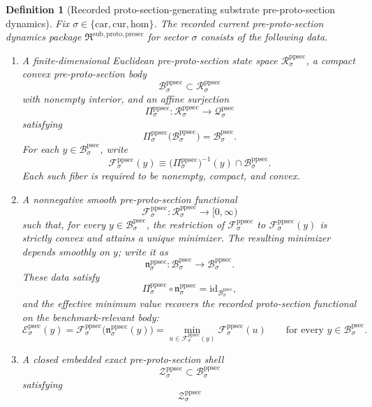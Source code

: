 \documentclass[11pt]{article}
\newcommand{\Car}{\mathrm{car}}
\newcommand{\Cur}{\mathrm{cur}}
\newcommand{\Hom}{\mathrm{hom}}
\newcommand{\ProtoSectionState}[1]{\mathcal Q_{#1}^{\mathrm{psec}}}
\newcommand{\ProtoSectionBody}[1]{\mathcal B_{#1}^{\mathrm{psec}}}
\newcommand{\ProtoSectionFunctional}[1]{\mathscr E_{#1}^{\mathrm{psec}}}
\newcommand{\PreProtoSectionPackage}{\mathfrak R^{\mathrm{sub,proto,presec}}}
\newcommand{\PreProtoSectionState}[1]{\mathcal R_{#1}^{\mathrm{ppsec}}}
\newcommand{\PreProtoSectionBody}[1]{\mathcal B_{#1}^{\mathrm{ppsec}}}
\newcommand{\PreProtoSectionProj}[1]{\Pi_{#1}^{\mathrm{ppsec}}}
\newcommand{\PreProtoSectionFiber}[2]{\mathcal F_{#1}^{\mathrm{ppsec}}(#2)}
\newcommand{\PreProtoSectionProtoMin}[1]{\mathfrak n_{#1}^{\mathrm{ppsec}}}
\newcommand{\PreProtoSectionFunctional}[1]{\mathscr F_{#1}^{\mathrm{ppsec}}}
\newcommand{\PreProtoSectionShell}[1]{\mathcal Z_{#1}^{\mathrm{ppsec}}}
\newtheorem{definition}{Definition}
\begin{document}
\begin{definition}[Recorded proto-section-generating substrate pre-proto-section dynamics]
\label{def:preprotosection}
Fix \(\sigma\in\{\Car,\Cur,\Hom\}\). The recorded current pre-proto-section dynamics package \(\PreProtoSectionPackage\) for sector \(\sigma\) consists of the following data.
\begin{enumerate}
    \item A finite-dimensional Euclidean pre-proto-section state space \(\PreProtoSectionState{\sigma}\), a compact convex pre-proto-section body
    \[
    \PreProtoSectionBody{\sigma}\subset\PreProtoSectionState{\sigma}
    \]
    with nonempty interior, and an affine surjection
    \[
    \PreProtoSectionProj{\sigma}:\PreProtoSectionState{\sigma}\to\ProtoSectionState{\sigma}
    \]
    satisfying
    \[
    \PreProtoSectionProj{\sigma}\bigl(\PreProtoSectionBody{\sigma}\bigr)=\ProtoSectionBody{\sigma}.
    \]
    For each \(y\in\ProtoSectionBody{\sigma}\), write
    \[
    \PreProtoSectionFiber{\sigma}{y}
    \equiv
    \bigl(\PreProtoSectionProj{\sigma}\bigr)^{-1}(y)\cap\PreProtoSectionBody{\sigma}.
    \]
    Each such fiber is required to be nonempty, compact, and convex.
    \item A nonnegative smooth pre-proto-section functional
    \[
    \PreProtoSectionFunctional{\sigma}:\PreProtoSectionState{\sigma}\to[0,\infty)
    \]
    such that, for every \(y\in\ProtoSectionBody{\sigma}\), the restriction of \(\PreProtoSectionFunctional{\sigma}\) to \(\PreProtoSectionFiber{\sigma}{y}\) is strictly convex and attains a unique minimizer. The resulting minimizer depends smoothly on \(y\); write it as
    \[
    \PreProtoSectionProtoMin{\sigma}:\ProtoSectionBody{\sigma}\to\PreProtoSectionBody{\sigma}.
    \]
    These data satisfy
    \[
    \PreProtoSectionProj{\sigma}\circ\PreProtoSectionProtoMin{\sigma}
    =
    \mathrm{id}_{\ProtoSectionBody{\sigma}},
    \]
    and the effective minimum value recovers the recorded proto-section functional on the benchmark-relevant body:
    \[
    \ProtoSectionFunctional{\sigma}(y)
    =
    \PreProtoSectionFunctional{\sigma}\bigl(\PreProtoSectionProtoMin{\sigma}(y)\bigr)
    =
    \min_{u\in\PreProtoSectionFiber{\sigma}{y}}
    \PreProtoSectionFunctional{\sigma}(u)
    \qquad
    \text{for every }
    y\in\ProtoSectionBody{\sigma}.
    \]
    \item A closed embedded exact pre-proto-section shell
    \[
    \PreProtoSectionShell{\sigma}\subset\PreProtoSectionBody{\sigma}
    \]
    satisfying
    \[
    \PreProtoSectionShell{\sigma}
\]
\end{enumerate}
\end{definition}
\end{document}
